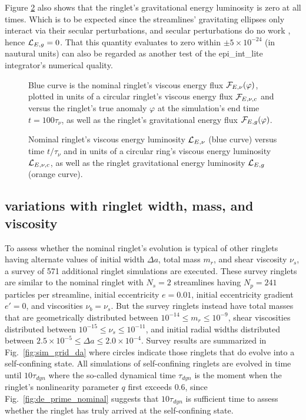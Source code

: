 \documentclass[preprint]{aastex62}
\begin{document}
Figure \ref{fig:nominal_energy_luminosity} also shows that 
the ringlet's gravitational energy luminosity is zero at all times. Which is to be expected since 
the streamlines' gravitating ellipses only interact via their secular
perturbations, and secular perturbations do no work \citep{BC61}, hence ${\cal L}_{E,g}=0$.
That this quantity evaluates to zero within $\pm5\times10^{-24}$ (in nautural units) can also be regarded
as another test of the epi\_int\_lite integrator's numerical quality.


\begin{figure}
    \caption{
        \label{fig:nominal_energy_flux}
        Blue curve is the nominal ringlet's viscous energy flux ${\cal F}_{E,\nu}(\varphi)$, plotted 
        in units of a circular ringlet's viscous energy flux ${\cal F}_{E,\nu,c}$ 
        and versus the ringlet's true anomaly $\varphi$ at the simulation's end time $t=100\tau_\nu$, 
        as well as the ringlet's gravitational energy flux ${\cal F}_{E,g}(\varphi)$.
    }
\end{figure}

\begin{figure}
    \caption{
        \label{fig:nominal_energy_luminosity}
        Nominal ringlet's viscous energy luminosity ${\cal L}_{E,\nu}$ (blue curve) versus time $t/\tau_\nu$
        and in units of a circular ring's viscous energy luminosity ${\cal L}_{E,\nu,c}$, 
        as well as the ringlet gravitational energy luminosity ${\cal L}_{E,g}$ (orange curve).
    }
\end{figure}


\subsection{variations with ringlet width, mass, and viscosity}
\label{subsec:variations}

To assess whether the nominal ringlet's evolution is typical of other ringlets
having alternate values of initial width $\Delta a$, total mass $m_r$, and shear viscosity $\nu_s$,
a survey of 571 additional ringlet simulations are executed. 
These survey ringlets are similar to the nominal ringlet 
with $N_s=2$ streamlines having $N_p=241$ particles per streamline, initial 
eccentricity $e=0.01$, initial eccentricity gradient $e'=0$, and viscosities $\nu_b=\nu_s$. 
But the survey ringlets instead have
total masses that are geometrically distributed between $10^{-14}\le m_r\le10^{-9}$,
shear viscosities distributed between $10^{-15}\le \nu_s\le 10^{-11}$,
and initial radial widths distributed between  
$2.5\times10^{-5}\le \Delta a\le2.0\times10^{-4}$. Survey results are summarized in Fig.\ \ref{fig:sim_grid_da}
where circles indicate those ringlets that do evolve into a self-confining state.
All simulations of self-confining ringlets are evolved in time until 
$10\tau_{dyn}$ where the so-called dynamical time $\tau_{dyn}$ is the moment when
the ringlet's nonlinearity parameter $q$ first exceeds $0.6$, since Fig.\ \ref{fig:de_prime_nominal}
suggests that $10\tau_{dyn}$ is sufficient time to assess whether the ringlet
has truly arrived at the self-confining state. 
\end{document}
